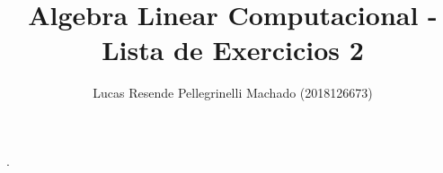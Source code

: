 \documentclass[11pt]{article}
\begin{document}
  {}%
  {}%
  {}%
  {}%
  {\bfseries}%
  {.}%
  {\newline}%
  {}%

\theoremstyle{definition}
\theoremstyle{break}
\newtheorem{exerc}{Exercício}

\author{Lucas Resende Pellegrinelli Machado (2018126673)}
\title{Algebra Linear Computacional - Lista de Exercicios 2}
\maketitle

\medskip
\end{document}
